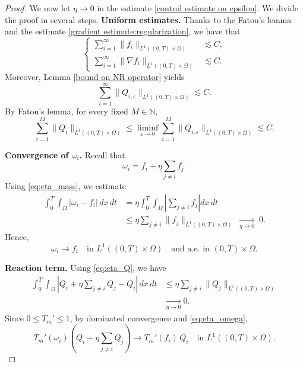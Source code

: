 \documentclass[a4paper,12pt,reqno]{amsart}
\theoremstyle{plain}
\numberwithin{equation}{section}
\begin{document}
	\begin{proof}
		We now let $\eta \to 0$ in the estimate \eqref{control estimate on epsilon}. We divide the proof in several steps.
		\newline 
		\textbf{Uniform estimates.}
		Thanks to the Fatou's lemma and the estimate \eqref{gradient estimate:regularization}, we have that
		\begin{equation}\label{eq:eta_mass}
			\left \{
			\begin{aligned}
				\sum_{i=1}^{\infty} \| f_i \|_{L^1((0,T)\times\Omega)}
				&\lesssim
				C,\\
				\sum_{i=1}^{\infty} \| \nabla f_i \|_{L^1((0,T)\times\Omega)}
				&\lesssim
				C.
			\end{aligned}
			\right .
		\end{equation}
		Moreover, Lemma \eqref{bound on NR operator} yields
		\begin{equation}\label{eq:eta_Qeps}
			\sum_{i=1}^{\infty} \| Q_{i,\varepsilon} \|_{L^1((0,T)\times\Omega)}
			\lesssim C.
		\end{equation}
		By Fatou's lemma, for every fixed $M\in\mathbb{N}$,
		\begin{equation}\label{eq:eta_Q}
			\sum_{i=1}^{M} \| Q_i \|_{L^1((0,T)\times\Omega)}
			\le
			\liminf_{\varepsilon\to0}
			\sum_{i=1}^{M} \| Q_{i,\varepsilon} \|_{L^1((0,T)\times\Omega)}
			\lesssim
			C.
		\end{equation}
		
		\medskip
		
		\noindent\textbf{Convergence of $\omega_i$.}
		Recall that
		\[
		\omega_i
		=
		f_i + \eta \sum_{j\neq i} f_j.
		\]
		Using \eqref{eq:eta_mass}, we estimate
		\begin{align*}
			\int_0^T\!\!\int_\Omega
			\left|
			\omega_i - f_i
			\right|
			\,dx\,dt
			&=
			\eta \int_0^T\!\!\int_\Omega
			\left|
			\sum_{j\neq i} f_j
			\right|
			dx\,dt
			\\
			&\le
			\eta \sum_{j\neq i}
			\| f_j \|_{L^1((0,T)\times\Omega)}
			\;\xrightarrow[\eta\to0]{}\;0.
		\end{align*}
		Hence,
		\begin{equation}\label{eq:eta_omega}
			\omega_i \longrightarrow f_i
			\quad\text{in }L^1((0,T)\times\Omega)
			\quad\text{and a.e. in }(0,T)\times\Omega.
		\end{equation}
		
		\medskip
		
		\noindent\textbf{Reaction term.}
		Using \eqref{eq:eta_Q}, we have
		\begin{align*}
			\int_0^T\!\!\int_\Omega
			\left|
			Q_i + \eta \sum_{j\neq i} Q_j - Q_i
			\right|
			\,dx\,dt
			&\le
			\eta \sum_{j\neq i}
			\| Q_j \|_{L^1((0,T)\times\Omega)}
			\\
			&\xrightarrow[\eta\to0]{} 0.
		\end{align*}
		Since $0 \le T_m' \le 1$, by dominated convergence and \eqref{eq:eta_omega},
		\begin{equation}\label{eq:eta_reaction}
			T_m'(\omega_i)
			\left(
			Q_i + \eta \sum_{j\neq i} Q_j
			\right)
			\longrightarrow
			T_m'(f_i)\,Q_i
			\quad\text{in }L^1((0,T)\times\Omega).
		\end{equation}
		

\end{proof}
\end{document}
